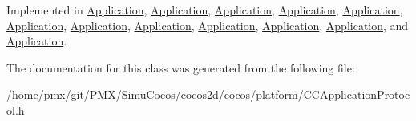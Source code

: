 Implemented in \hyperlink{classApplication_af04c472d3fac0d922d088896504925ac}{Application}, \hyperlink{classApplication_af04c472d3fac0d922d088896504925ac}{Application}, \hyperlink{classApplication_af04c472d3fac0d922d088896504925ac}{Application}, \hyperlink{classApplication_a1b5b44a0013466855dce330a517885c3}{Application}, \hyperlink{classApplication_a3160c4ee81ef7fba87d7299991998d5b}{Application}, \hyperlink{classApplication_a760516339314580f5086173d006483cc}{Application}, \hyperlink{classApplication_af04c472d3fac0d922d088896504925ac}{Application}, \hyperlink{classApplication_a3160c4ee81ef7fba87d7299991998d5b}{Application}, \hyperlink{classApplication_af04c472d3fac0d922d088896504925ac}{Application}, \hyperlink{classApplication_af04c472d3fac0d922d088896504925ac}{Application}, \hyperlink{classApplication_af04c472d3fac0d922d088896504925ac}{Application}, and \hyperlink{classApplication_a760516339314580f5086173d006483cc}{Application}.



The documentation for this class was generated from the following file\+:\begin{DoxyCompactItemize}
\item 
/home/pmx/git/\+P\+M\+X/\+Simu\+Cocos/cocos2d/cocos/platform/C\+C\+Application\+Protocol.\+h\end{DoxyCompactItemize}
